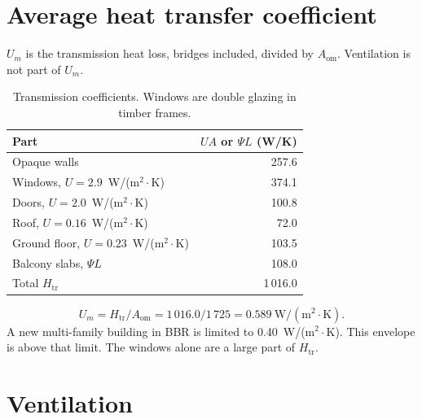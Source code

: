 \documentclass[11pt,a4paper]{article}
\newcommand{\WmTwoK}{W/(m$^{2}{\cdot}$K)}
\begin{document}
\section{Average heat transfer coefficient}
\label{sec:um}

$U_m$ is the transmission heat loss, bridges included, divided by
$A_{\mathrm{om}}$. Ventilation is not part of $U_m$.

\begin{table}[ht]
\centering
\caption{Transmission coefficients. Windows are double glazing in timber
frames.}
\label{tab:um}
\begin{tabular}{@{}lr@{}}
\toprule
Part & $UA$ or $\Psi L$ (W/K) \\
\midrule
Opaque walls & 257.6 \\
Windows, $U = 2.9$~\WmTwoK & 374.1 \\
Doors, $U = 2.0$~\WmTwoK & 100.8 \\
Roof, $U = 0.16$~\WmTwoK & 72.0 \\
Ground floor, $U = 0.23$~\WmTwoK & 103.5 \\
Balcony slabs, $\Psi L$ & 108.0 \\
\midrule
Total $H_{\mathrm{tr}}$ & 1\,016.0 \\
\bottomrule
\end{tabular}
\end{table}

\begin{equation}
  U_m = H_{\mathrm{tr}} / A_{\mathrm{om}}
      = 1\,016.0 / 1\,725
      = 0.589~\mathrm{W/(m^{2}{\cdot}K)}.
  \label{eq:um}
\end{equation}
A new multi-family building in BBR is limited to 0.40~\WmTwoK.
This envelope is above that limit. The windows alone are a large part
of $H_{\mathrm{tr}}$.

\section{Ventilation}
\end{document}
